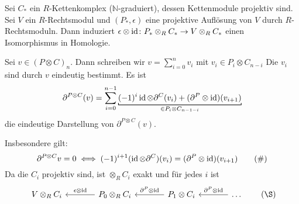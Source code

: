 \begin{lemma}[label=projaufl:iso:hom]
	Sei $C_*$ ein $R$-Kettenkomplex ($\mathbb{N}$-graduiert), dessen Kettenmodule projektiv sind.
	Sei $V$ ein $R$-Rechtsmodul und $(P_*,\epsilon)$ eine projektive Auflösung von $V$ durch $R$-Rechtsmoduln.
	Dann induziert $\epsilon \otimes \operatorname{id} \colon P_* \otimes_R C_* \to V \otimes_R C_*$ einen Isomorphismus in Homologie.
\end{lemma}
\begin{beweis}
	Sei $v \in (P \otimes C)_n$.
	Dann schreiben wir $v=\sum_{i=0}^{n} v_i$ mit $v_i \in P_i \otimes C_{n-i}$
	Die $v_i$ sind durch $v$ eindeutig bestimmt.
	Es ist
	\[
		\partial^{P \otimes C}(v)= \sum_{i=0}^{n-1} \Underbracket{(-1)^i \id \otimes \partial^C(v_i) + (\partial^P \otimes \id)(v_{i+1})}{\in P_i \otimes C_{n-1-i}}
	\]
	die eindeutige Darstellung von $\partial^{P \otimes C}(v)$.
	\begin{figure}[bt]
	\end{figure}%
	Insbesondere gilt: 
	\begin{equation}
		\partial^{P \otimes C}v =0 \iff (-1)^{i+1} (\operatorname{id} \otimes \partial^C)(v_i)= (\partial^P \otimes \operatorname{id})(v_{i+1}) \label{eq:13:1}\tag{\#}
	\end{equation}
	Da die $C_i$ projektiv sind, ist $\otimes_R C_i$ exakt und für jedes $i$ ist 
	\begin{equation}
		\begin{tikzcd}[sep=large]
			V \otimes_R C_i & P_0 \otimes_R C_i \lar["\epsilon \otimes \id"'] & P_1 \otimes C_i \lar["\partial^P \otimes \id"'] & \ldots \lar["\partial^P \otimes \id"']
		\end{tikzcd}
		\label{eq:13:2}\tag{\S}
	\end{equation}

\end{beweis}
